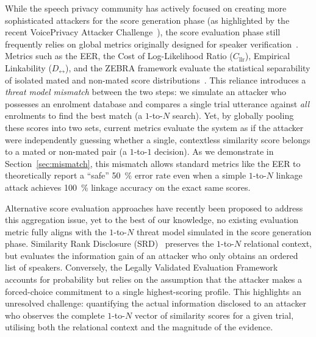 While the speech privacy community has actively focused on creating more sophisticated attackers for the score generation phase (as highlighted by the recent VoicePrivacy Attacker Challenge~\cite{tomashenko2025first}), the score evaluation phase still frequently relies on global metrics originally designed for speaker verification~\cite{champion2023anonymizing}. Metrics such as the EER, the Cost of Log-Likelihood Ratio ($C_{\text{llr}}$), Empirical Linkability ($D_{\leftrightarrow}$), and the ZEBRA framework evaluate the statistical separability of isolated mated and non-mated score distributions~\cite{maouche2020comparative}. This reliance introduces a \textit{threat model mismatch} between the two steps: we simulate an attacker who possesses an enrolment database and compares a single trial utterance against \textit{all} enrolments to find the best match (a $1$-to-$N$ search). Yet, by globally pooling these scores into two sets, current metrics evaluate the system as if the attacker were independently guessing whether a single, contextless similarity score belongs to a mated or non-mated pair (a $1$-to-$1$ decision). As we demonstrate in Section~\ref{sec:mismatch}, this mismatch allows standard metrics like the EER to theoretically report a ``safe'' \qty{50}{\percent} error rate even when a simple $1$-to-$N$ linkage attack achieves \qty{100}{\percent} linkage accuracy on the exact same scores.

Alternative score evaluation approaches have recently been proposed to address this aggregation issue, yet to the best of our knowledge, no existing evaluation metric fully aligns with the $1$-to-$N$ threat model simulated in the score generation phase. Similarity Rank Disclosure (SRD)~\cite{backstrom2026privacy} preserves the $1$-to-$N$ relational context, but evaluates the information gain of an attacker who only obtains an ordered list of speakers.
Conversely, the Legally Validated Evaluation Framework~\cite{vauquier2025legally} accounts for probability but relies on the assumption that the attacker makes a forced-choice commitment to a single highest-scoring profile. This highlights an unresolved challenge: quantifying the actual information disclosed to an attacker who observes the complete $1$-to-$N$ vector of similarity scores for a given trial, utilising both the relational context and the magnitude of the evidence.


